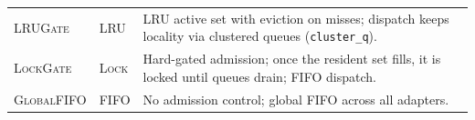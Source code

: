 \begin{table}[t]
\begin{tabularx}{\textwidth}{@{} l l >{\raggedright\arraybackslash}X @{}}
\textsc{LRUGate} & \textsc{LRU} &
LRU active set with eviction on misses; dispatch keeps locality via clustered queues (\texttt{cluster\_q}). \\

\textsc{LockGate} & \textsc{Lock} &
Hard-gated admission; once the resident set fills, it is locked until queues drain; FIFO dispatch. \\

\textsc{GlobalFIFO} & \textsc{FIFO} &
No admission control; global FIFO across all adapters. \\
\bottomrule
\end{tabularx}

\label{tab:policy_variants}
\end{table}
